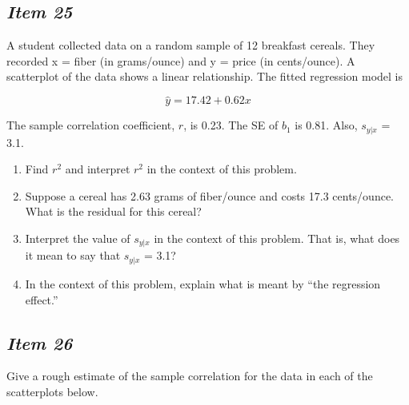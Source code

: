 \subsection{\textbf{\textit{Item 25}}}


A student collected data on a random sample of 12 breakfast cereals. They recorded x = fiber (in grams/ounce) and y = price (in cents/ounce). A scatterplot of the data shows a linear relationship. The fitted regression model is





\begin{equation*}
\hat{y} = 17.42 + 0.62x
\end{equation*}





The sample correlation coefficient, $r$, is 0.23. The SE of $b_1$ is 0.81. Also, $s_{y|x}$ = 3.1.


\begin{enumerate}[leftmargin=1cm, itemsep=.2em]


\item Find $r^2$ and interpret $r^2$ in the context of this problem.


\item Suppose a cereal has 2.63 grams of fiber/ounce and costs 17.3 cents/ounce. What is the residual for this cereal?


\item Interpret the value of $s_{y|x}$ in the context of this problem. That is, what does it mean to say that $s_{y|x}$ = 3.1?


\item In the context of this problem, explain what is meant by ``the regression effect.''


\end{enumerate}





\subsection{\textbf{\textit{Item 26}}}


Give a rough estimate of the sample correlation for the data in each of the scatterplots below.





